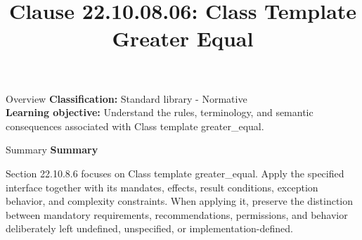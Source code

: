 \documentclass[10pt,letterpaper]{article}
\title{Clause 22.10.08.06: Class Template Greater Equal}
\author{}
\date{}
\begin{document}
\maketitle
\begin{CornellOverviewBox}{Overview}
\textbf{Classification:} Standard library - Normative\\[2pt]
\textbf{Learning objective:} Understand the rules, terminology, and semantic consequences associated with Class template greater\_equal.
\end{CornellOverviewBox}\begin{CornellSummaryBox}{Summary}
{\sffamily\bfseries\color{Accent} Summary}\par\vspace{3pt}Section 22.10.8.6 focuses on Class template greater\_equal. Apply the specified interface together with its mandates, effects, result conditions, exception behavior, and complexity constraints. When applying it, preserve the distinction between mandatory requirements, recommendations, permissions, and behavior deliberately left undefined, unspecified, or implementation-defined.
\end{CornellSummaryBox}
\end{document}
